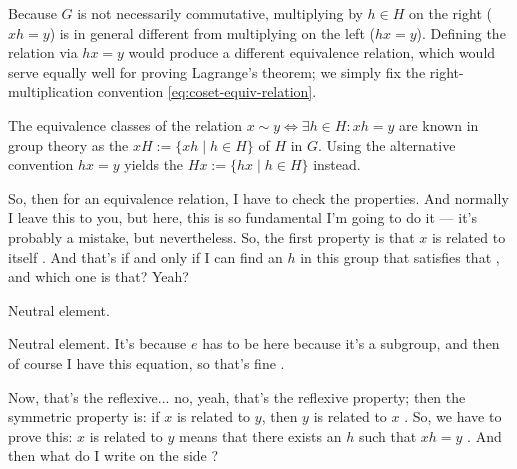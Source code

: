 \begin{proofWrapper}
\begin{content}
\begin{steps}
Because $G$ is not necessarily commutative, multiplying by $h \in H$ on the right ($xh = y$) is in general different from multiplying on the left ($hx = y$). Defining the relation via $hx = y$ would produce a different equivalence relation, which would serve equally well for proving Lagrange's theorem; we simply fix the right-multiplication convention \eqref{eq:coset-equiv-relation}.
\end{steps}
\end{content}

\begin{aiNote}
The equivalence classes of the relation $x \sim y \iff \exists h \in H \colon xh = y$ are known in group theory as the  $xH := \{xh \mid h \in H\}$ of $H$ in $G$. Using the alternative convention $hx = y$ yields the  $Hx := \{hx \mid h \in H\}$ instead.
\end{aiNote}

\begin{speech}[00:15:48 - 00:16:15]
So, then for an equivalence relation, I have to check the properties. And normally I leave this to you, but here, this is so fundamental I'm going to do it --- it's probably a mistake, but nevertheless. So, the first property is that $x$ is related to itself . And that's if and only if I can find an $h$ in this group that satisfies that , and which one is that? Yeah?
\end{speech}

\begin{student}
Neutral element.
\end{student}

\begin{speech}[00:16:17 - 00:17:27]
Neutral element. It's because $e$ has to be here because it's a subgroup, and then of course I have this equation, so that's fine .

Now, that's the reflexive... no, yeah, that's the reflexive property; then the symmetric property is: if $x$ is related to $y$, then $y$ is related to $x$ . So, we have to prove this: $x$ is related to $y$ means that there exists an $h$ such that $xh = y$ . And then what do I write on the  side ?


\end{speech}
\end{proofWrapper}
